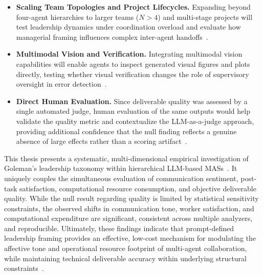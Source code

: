 \begin{itemize}
    \item \textbf{Scaling Team Topologies and Project Lifecycles.}
    Expanding beyond four-agent hierarchies to larger teams ($N > 4$) and multi-stage projects will test leadership dynamics under coordination overload and evaluate how managerial framing influences complex inter-agent handoffs~\cite{wang2026multiagentsystemsclassicalparadigms, hong2024metagptmetaprogrammingmultiagent, mathieu2017teamwork}.

    \item \textbf{Multimodal Vision and Verification.}
    Integrating multimodal vision capabilities will enable agents to inspect generated visual figures and plots directly, testing whether visual verification changes the role of supervisory oversight in error detection~\cite{guo2024largelanguagemodelbased}.

    \item \textbf{Direct Human Evaluation.}
    Since deliverable quality was assessed by a single automated judge, human evaluation of the same outputs would help validate the quality metric and contextualize the LLM-as-a-judge approach, providing additional confidence that the null finding reflects a genuine absence of large effects rather than a scoring artifact~\cite{zheng2023judgingllmasajudgemtbenchchatbot, chen2025multiagentasjudgealigningllmagentbasedautomated}.
\end{itemize}

This thesis presents a systematic, multi-dimensional empirical investigation of Goleman's leadership taxonomy within hierarchical \ac{LLM}-based \acp{MAS}~\cite{goleman2000leadership}.
It uniquely couples the simultaneous evaluation of communication sentiment, post-task satisfaction, computational resource consumption, and objective deliverable quality.
While the null result regarding quality is limited by statistical sensitivity constraints, the observed shifts in communication tone, worker satisfaction, and computational expenditure are significant, consistent across multiple analyzers, and reproducible.
Ultimately, these findings indicate that prompt-defined leadership framing provides an effective, low-cost mechanism for modulating the affective tone and operational resource footprint of multi-agent collaboration, while maintaining technical deliverable accuracy within underlying structural constraints~\cite{white2023promptpatterncatalogenhance, kwak2026leadershipcoordinationcontrolbehavioral}.
